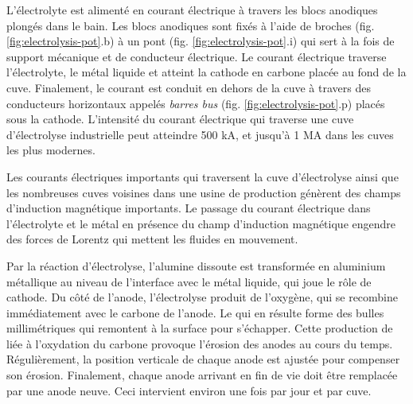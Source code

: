 L'électrolyte est alimenté en courant électrique à travers les blocs
anodiques plongés dans le bain. Les blocs anodiques sont fixés à
l'aide de broches (fig. \ref{fig:electrolysis-pot}.b) à un pont
(fig. \ref{fig:electrolysis-pot}.i) qui sert à la fois de support
mécanique et de conducteur électrique. Le courant électrique traverse
l'électrolyte, le métal liquide et atteint la cathode en carbone
placée au fond de la cuve. Finalement, le courant est conduit en
dehors de la cuve à travers des conducteurs horizontaux appelés {\em
  barres bus} (fig. \ref{fig:electrolysis-pot}.p) placés sous la
cathode. L'intensité du courant électrique qui traverse une cuve
d'électrolyse industrielle peut atteindre \num{500} \si{\kilo\ampere},
et jusqu'à \num{1} \si{\mega\ampere} dans les cuves les plus modernes.

Les courants électriques importants qui traversent la cuve
d'électrolyse ainsi que les nombreuses cuves voisines dans une usine
de production génèrent des champs d'induction magnétique
importants. Le passage du courant électrique dans l'électrolyte et le
métal en présence du champ d'induction magnétique engendre des forces
de Lorentz qui mettent les fluides en mouvement.

Par la réaction d'électrolyse, l'alumine dissoute est transformée en
aluminium métallique au niveau de l'interface avec le métal liquide,
qui joue le rôle de cathode. Du côté de l'anode, l'électrolyse produit
de l'oxygène, qui se recombine immédiatement avec le carbone de
l'anode. Le  qui en résulte forme des bulles millimétriques
qui remontent à la surface pour s'échapper. Cette production de
 liée à l'oxydation du carbone provoque l'érosion des anodes
au cours du temps. Régulièrement, la position verticale de chaque
anode est ajustée pour compenser son érosion. Finalement, chaque
anode arrivant en fin de vie doit être remplacée par une anode
neuve. Ceci intervient environ une fois par jour et par cuve.

